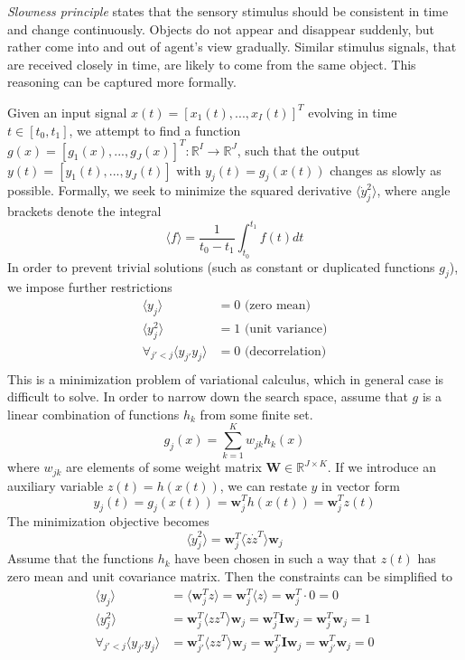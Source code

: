 \documentclass[oneside,english,logo]{amuthesis}
\begin{document}
\textit{Slowness principle} states that the sensory stimulus should be consistent in time and change continuously. Objects do not appear and disappear suddenly, but rather come into and out of agent's view gradually. Similar stimulus signals, that are received closely in time, are likely to come from the same object. This reasoning can be captured more formally. 

Given an input signal $x(t)=[x_1(t),...,x_I(t)]^T$ evolving in time $t\in[t_0,t_1]$, we attempt to find a  function $g(x)=[g_1(x),...,g_J(x)]^T:\mathbb{R}^I\rightarrow \mathbb{R}^J$, such that the output $y(t)=[y_1(t),...,y_J(t)]$ with $y_j(t)=g_j(x(t))$ changes as slowly as possible. 
Formally, we seek to minimize the squared derivative $\langle \dot{y}_j^2 \rangle$,
where angle brackets denote the integral
\[\langle f \rangle = \frac{1}{t_0-t_1} \int_{t_0}^{t_1} f(t) dt\]
In order to prevent trivial solutions (such as constant or duplicated functions $g_j$), we impose further restrictions
\begin{align*}
 \langle y_j \rangle &= 0\text{ (zero mean)}	\\
 \langle y_j^2 \rangle &= 1 \text{ (unit variance)} \\
\forall_{j'< j} \langle y_{j'} y_j \rangle &= 0 \text{ (decorrelation)} \\ 
\end{align*}
This is a minimization problem of variational calculus, which in general case is difficult to solve. In order to narrow down the search space, assume that $g$ is a linear combination of functions $h_k$ from some finite set.
\[
g_j(x) = \sum_{k=1}^K w_{jk} h_k(x)
\] 
where $w_{jk}$ are elements of some weight matrix $\boldsymbol{W}\in \mathbb{R}^{J \times K}$.
If we introduce an auxiliary variable $z(t)=h(x(t))$, we can restate $y$ in vector form 
\[
y_j(t)=g_j(x(t)) = \boldsymbol{w}_j^T h(x(t)) = \boldsymbol{w}_j^T z(t) 
\]
The minimization objective becomes  
\[
\langle \dot{y}_j^2 \rangle = \boldsymbol{w}_j^T \langle \dot{z} \dot{z}^T \rangle \boldsymbol{w}_j
\]
Assume that the functions $h_k$ have been chosen in such a way that $z(t)$ has zero mean and unit covariance matrix. Then the constraints can be simplified to
\begin{align*}
	\langle y_j \rangle &= \langle \boldsymbol{w}_j^T z \rangle = \boldsymbol{w}_j^T  \langle  z \rangle =  \boldsymbol{w}_j^T  \cdot 0 =  0 \\
	\langle y_j^2 \rangle &=  \boldsymbol{w}_j^T \langle z z^T \rangle \boldsymbol{w}_j = \boldsymbol{w}_j^T \textbf{I} \boldsymbol{w}_j = \boldsymbol{w}_j^T \boldsymbol{w}_j  = 1 \\
	\forall_{j' < j} \langle y_{j'} y_j \rangle &= \boldsymbol{w}_{j'}^T \langle z z^T \rangle \boldsymbol{w}_j = \boldsymbol{w}_{j'}^T \textbf{I} \boldsymbol{w}_j = \boldsymbol{w}_{j'}^T \boldsymbol{w}_j = 0 \\ 
\end{align*}
\end{document}
